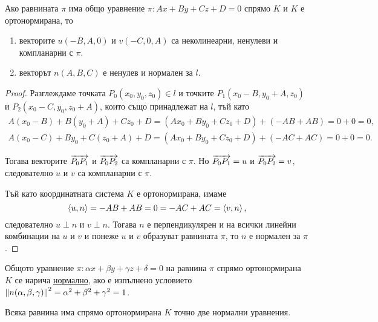 \documentclass[numbers=endperiod, DIV=15, bibliography=totocnumbered]{scrartcl}
\begin{document}
\begin{proposition}
  Ако равнината $\pi$ има общо уравнение $\pi: Ax + By + Cz + D = 0$ спрямо $K$ и $K$ е ортонормирана, то
  \begin{enumerate}
    \item векторите $u(-B, A, 0)$ и $v(-C, 0, A)$ са неколинеарни, ненулеви и компланарни с $\pi$.
    \item векторът $n(A, B, C)$ е ненулев и нормален за $l$.
  \end{enumerate}
\end{proposition}
\begin{proof}
  \item Разглеждаме точката $P_0(x_0, y_0, z_0) \in l$ и точките $P_1(x_0 - B, y_0 + A, z_0)$ и $P_2(x_0 - C, y_0, z_0 + A)$, които също принадлежат на $l$, тъй като
  \begin{align*}
    A(x_0 - B) + B(y_0 + A) + Cz_0 + D = (Ax_0 + By_0 + Cz_0 + D) + (-AB + AB) = 0 + 0 = 0, \\
    A(x_0 - C) + By_0 + C(z_0 + A) + D = (Ax_0 + By_0 + Cz_0 + D) + (-AC + AC) = 0 + 0 = 0.
  \end{align*}

  Тогава векторите $\overrightarrow{P_0 P_1}$ и $\overrightarrow{P_0 P_2}$ са компланарни с $\pi$. Но $\overrightarrow{P_0 P_1} = u$ и $\overrightarrow{P_0 P_2} = v$, следователно $u$ и $v$ са компланарни с $\pi$.

  \item Тъй като координатната система $K$ е ортонормирана, имаме
  \begin{displaymath}
    \left\langle u, n \right\rangle = -AB + AB = 0 = -AC + AC = \left\langle v, n \right\rangle,
  \end{displaymath}
  следователно $u \perp n$ и $v \perp n$. Тогава $n$ е перпендикулярен и на всички линейни комбинации на $u$ и $v$ и понеже $u$ и $v$ образуват равнината $\pi$, то $n$ е нормален за $\pi$.
\end{proof}

\begin{definition}
  Общото уравнение $\pi: \alpha x + \beta y + \gamma z + \delta = 0$ на равнина $\pi$ спрямо ортонормирана $K$ се нарича \uline{нормално}, ако е изпълнено условието $\left\Vert n(\alpha, \beta, \gamma) \right\Vert^2 = \alpha^2 + \beta^2 + \gamma^2 = 1$.
\end{definition}

\begin{proposition}
  Всяка равнина има спрямо ортонормирана $K$ точно две нормални уравнения.
\end{proposition}
\end{document}
